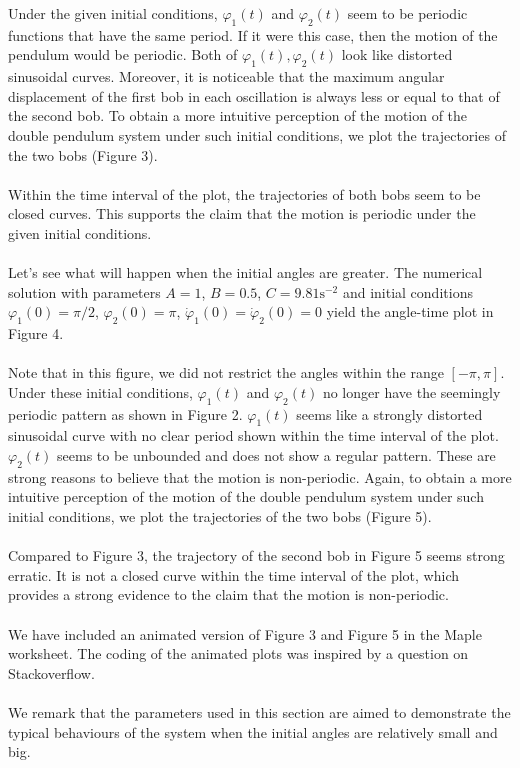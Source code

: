 \documentclass[11pt]{article}
\begin{document}
Under the given initial conditions, \(\varphi_1(t)\) and \(\varphi_2(t)\) seem to be periodic functions that have the same period.
If it were this case, then the motion of the pendulum would be periodic.
Both of \(\varphi_1(t), \varphi_2(t)\) look like distorted sinusoidal curves.
Moreover, it is noticeable that the maximum angular displacement of the first bob in each oscillation
is always less or equal to that of the second bob.
To obtain a more intuitive perception of the motion of the double pendulum system under such initial conditions, we plot the
trajectories of the two bobs (Figure 3).\\
\\
Within the time interval of the plot, the trajectories of both bobs seem to be closed curves.
This supports the claim that the motion is periodic under the given initial conditions. \\
\\
Let's see what will happen when the initial angles are greater. The numerical solution with parameters \(A = 1\), \(B= 0.5\), \(C = 9.81 \mathrm{s}^{-2}\) and initial conditions \(\varphi_1(0) = \pi/2\), \(\varphi_2(0)= \pi\), \(\dot{\varphi}_1(0) = \dot{\varphi}_2(0) = 0\) yield the angle-time plot in Figure 4. \\
\\
Note that in this figure, we did not restrict the angles within the range \([-\pi, \pi]\). Under these initial conditions,
\(\varphi_1(t)\) and \(\varphi_2(t)\) no longer have the seemingly periodic pattern as shown in Figure 2.
\(\varphi_1(t)\) seems like a strongly distorted sinusoidal curve with no clear period shown within the time interval
of the plot. \(\varphi_2(t)\) seems to be unbounded and does not show a regular pattern. These are strong reasons to believe that
the motion is non-periodic. Again, to obtain a more intuitive perception of the motion of the double pendulum system under such
initial conditions, we plot the trajectories of the two bobs (Figure 5).\\
\\
Compared to Figure 3, the trajectory of the second bob in Figure 5 seems strong erratic.
It is not a closed curve within the time interval of the plot, which provides a strong evidence to the claim that the motion
is non-periodic.\\
\\
We have included an animated version of Figure 3 and Figure 5 in the Maple worksheet. The coding of the animated plots
was inspired by a question on Stackoverflow\cite{anime}.\\
\\
We remark that the parameters used in this section are aimed to demonstrate the typical behaviours of the system
when the initial angles are relatively small and big.
\end{document}
